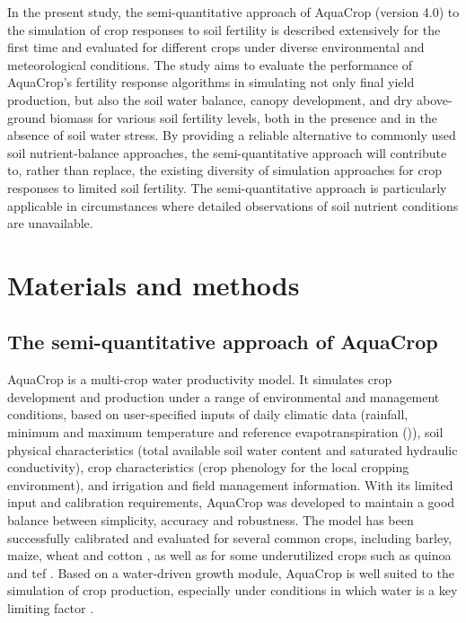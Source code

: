 In the present study, the semi-quantitative approach of AquaCrop (version 4.0) to the simulation of crop responses to soil fertility is described extensively for the first time and evaluated for different crops under diverse environmental and meteorological conditions. The study aims to evaluate the performance of AquaCrop's fertility response algorithms in simulating not only final yield production, but also the soil water balance, canopy development, and dry above-ground biomass for various soil fertility levels, both in the presence and in the absence of soil water stress. By providing a reliable alternative to commonly used soil nutrient-balance approaches, the semi-quantitative approach will contribute to, rather than replace, the existing diversity of simulation approaches for crop responses to limited soil fertility. The semi-quantitative approach is particularly applicable in circumstances where detailed observations of soil nutrient conditions are unavailable. 

\section{Materials and methods}
\subsection{The semi-quantitative approach of AquaCrop}
AquaCrop is a multi-crop water productivity model. It simulates crop development and production under a range of environmental and management conditions, based on user-specified inputs of daily climatic data (rainfall, minimum and maximum temperature and reference evapotranspiration (\ETo)), soil physical characteristics (total available soil water content and saturated hydraulic conductivity), crop characteristics (crop phenology for the local cropping environment), and irrigation and field management information. With its limited input and calibration requirements, AquaCrop was developed to maintain a good balance between simplicity, accuracy and robustness. The model has been successfully calibrated and evaluated for several common crops, including barley, maize, wheat and cotton \parencite{garciavila2009,heng2009,andarzian2011,abrha2012}, as well as for some underutilized crops such as quinoa and tef \parencite{geerts2009,tsegay2012}. Based on a water-driven growth module, AquaCrop is well suited to the simulation of crop production, especially under conditions in which water is a key limiting factor \parencite{geerts2010,stricevic2011,abedinpour2012}. 

